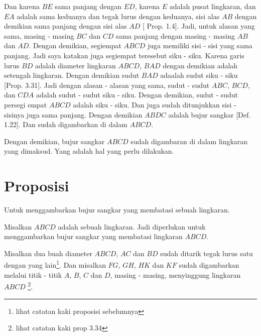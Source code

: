 \documentclass[a4paper]{book}
\begin{document}
Dan karena $BE$ sama panjang dengan $ED$, karena $E$ adalah pusat 
lingkaran, dan $EA$ adalah sama keduanya dan tegak lurus dengan keduanya, 
sisi alas $AB$ dengan demikian sama panjang dengan sisi alas $AD$ [
Prop. 1.4]. Jadi, untuk alasan yang sama, masing - masing $BC$ dan $CD$ 
sama panjang dengan masing - masing $AB$ dan $AD$. Dengan demikian, 
segiempat $ABCD$ juga memiliki sisi - sisi yang sama panjang. Jadi saya
katakan juga segiempat teresebut siku - siku. Karena garis lurus
$BD$ adalah diameter lingkaran $ABCD$, $BAD$ dengan demikian adalah 
setengah lingkaran. Dengan demikian sudut $BAD$ adaalah sudut siku - siku
[Prop. 3.31]. Jadi dengan alasan - alasan yang sama, sudut - sudut $ABC$,
$BCD$, dan $CDA$ adalah sudut - sudut siku - siku. Dengan demikian, 
sudut - sudut persegi empat $ABCD$ adalah siku - siku. Dan juga sudah 
ditunjukkan sisi - sisinya juga sama panjang. Dengan demikian $ABDC$ adalah
bujur sangkar [Def. 1.22]. Dan sudah digambarkan di dalam $ABCD$.

Dengan demikian, bujur sangkar $ABCD$ sudah digambaran di dalam lingkaran
yang dimaksud. Yang adalah hal yang perlu dilakukan.

\section*{\centering Proposisi \thesection}
Untuk menggambarkan bujur sangkar yang membatasi sebuah lingkaran.
\begin{center} 
\end{center} 
Misalkan $ABCD$ adalah sebuah lingkaran. Jadi diperlukan untuk menggambarkan
bujur sangkar yang membatasi lingkaran $ABCD$.

Misalkan dua buah diameter $ABCD$, $AC$ dan $BD$ sudah ditarik tegak lurus
satu dengan yang lain\footnote{lihat catatan kaki proposisi sebelumnya}. Dan 
misalkan $FG$, $GH$, $HK$ dan $KF$ sudah digambarkan melalui titik - titik
$A$, $B$, $C$ dan $D$, masing - masing, menyinggung lingkaran $ABCD$ 
\footnote{lihat catatan kaki prop 3.34}.
\end{document}
